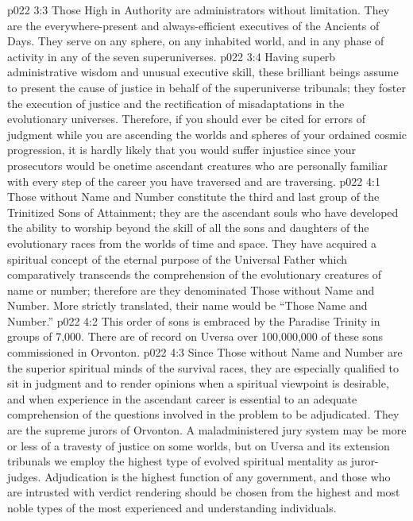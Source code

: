 \vs p022 3:3 Those High in Authority are administrators without limitation. They are the everywhere\hyp{}present and always\hyp{}efficient executives of the Ancients of Days. They serve on any sphere, on any inhabited world, and in any phase of activity in any of the seven superuniverses.
\vs p022 3:4 Having superb administrative wisdom and unusual executive skill, these brilliant beings assume to present the cause of justice in behalf of the superuniverse tribunals; they foster the execution of justice and the rectification of misadaptations in the evolutionary universes. Therefore, if you should ever be cited for errors of judgment while you are ascending the worlds and spheres of your ordained cosmic progression, it is hardly likely that you would suffer injustice since your prosecutors would be onetime ascendant creatures who are personally familiar with every step of the career you have traversed and are traversing.
\vs p022 4:1 Those without Name and Number constitute the third and last group of the Trinitized Sons of Attainment; they are the ascendant souls who have developed the ability to worship beyond the skill of all the sons and daughters of the evolutionary races from the worlds of time and space. They have acquired a spiritual concept of the eternal purpose of the Universal Father which comparatively transcends the comprehension of the evolutionary creatures of name or number; therefore are they denominated Those without Name and Number. More strictly translated, their name would be “Those  Name and Number.”
\vs p022 4:2 This order of sons is embraced by the Paradise Trinity in groups of 7,000. There are of record on Uversa over 100,000,000 of these sons commissioned in Orvonton.
\vs p022 4:3 Since Those without Name and Number are the superior spiritual minds of the survival races, they are especially qualified to sit in judgment and to render opinions when a spiritual viewpoint is desirable, and when experience in the ascendant career is essential to an adequate comprehension of the questions involved in the problem to be adjudicated. They are the supreme jurors of Orvonton. A maladministered jury system may be more or less of a travesty of justice on some worlds, but on Uversa and its extension tribunals we employ the highest type of evolved spiritual mentality as juror\hyp{}judges. Adjudication is the highest function of any government, and those who are intrusted with verdict rendering should be chosen from the highest and most noble types of the most experienced and understanding individuals.
